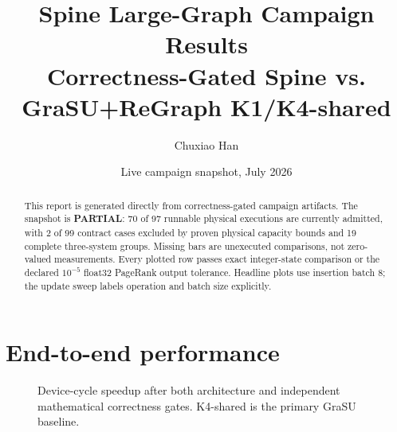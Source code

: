 \documentclass[10pt]{article}
\title{\textbf{Spine Large-Graph Campaign Results}\\
\large Correctness-Gated Spine vs. GraSU+ReGraph K1/K4-shared}
\author{Chuxiao Han}
\date{Live campaign snapshot, July 2026}
\begin{document}
\maketitle
\begin{abstract}
This report is generated directly from correctness-gated campaign artifacts.
The snapshot is \textbf{PARTIAL}: 70 of 97 runnable
physical executions are currently admitted, with 2 of
99 contract cases excluded by proven physical capacity
bounds and 19 complete three-system groups. Missing bars are
unexecuted comparisons, not zero-valued measurements. Every plotted row passes
exact integer-state comparison or the declared $10^{-5}$ float32 PageRank
output tolerance.
Headline plots use insertion batch 8; the update sweep labels operation and
batch size explicitly.
\end{abstract}

\section{End-to-end performance}
\begin{figure}[ht]
\centering
{}
\caption{Device-cycle speedup after both architecture and independent
mathematical correctness gates. K4-shared is the primary GraSU baseline.}
\end{figure}
\clearpage
\end{document}
